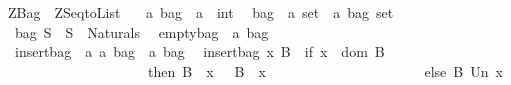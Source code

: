 %
\begin{isabellebody}%
\def\isabellecontext{ZBag}%
%
\isamarkuptrue%
%
\isadelimtheory
%
\endisadelimtheory
%
\isatagtheory
{}\isamarkupfalse%
\ ZBag\ \ ZSeqtoList\ %
\endisatagtheory
{\isafoldtheory}%
%
\isadelimtheory
%
\endisadelimtheory
\isanewline
\isanewline
{}\isamarkupfalse%
\isanewline
\isanewline
\ \ {\isacharparenleft}{\isacharprime}a{\isacharparenright}\ {\isachardoublequoteopen}bag{\isachardoublequoteclose}\ {\isacharequal}\ {\isachardoublequoteopen}{\isacharprime}a\ {\isacharless}{\isacharequal}{\isachargreater}\ int{\isachardoublequoteclose}\isanewline
\isanewline
{}\isamarkupfalse%
\isanewline
\ \ bag\ {\isacharcolon}{\isacharcolon}\ {\isachardoublequoteopen}{\isacharprime}a\ set\ {\isacharequal}{\isachargreater}\ {\isacharparenleft}{\isacharprime}a\ bag{\isacharparenright}\ set{\isachardoublequoteclose}\isanewline
\ \ {\isachardoublequoteopen}bag\ S\ {\isacharequal}{\isacharequal}\ S\ {\isacharminus}{\isacharbar}{\isacharminus}{\isachargreater}\ Naturals{\isacharunderscore}{}{\isachardoublequoteclose}\isanewline
\isanewline
\ \ emptybag\ {\isacharcolon}{\isacharcolon}\ {\isachardoublequoteopen}{\isacharprime}a\ bag{\isachardoublequoteclose}\ \ \ \ \ \ \ \ \ \ \ \ \ \ \ \ \ \ \ \ \ \ \ \ \ \ \ {\isacharparenleft}{\isachardoublequoteopen}{\isacharpercent}{\isacharbrackleft}{\isacharpercent}{\isacharbrackright}{\isachardoublequoteclose}{\isacharparenright}\isanewline
\ \ {\isachardoublequoteopen}{\isacharpercent}{\isacharbrackleft}{\isacharpercent}{\isacharbrackright}\ {\isacharequal}{\isacharequal}\ {\isacharbraceleft}{\isacharbraceright}{\isachardoublequoteclose}\isanewline
\isanewline
\ \ insertbag\ {\isacharcolon}{\isacharcolon}\ {\isachardoublequoteopen}{\isacharbrackleft}{\isacharprime}a{\isacharcomma}\ {\isacharprime}a\ bag{\isacharbrackright}\ {\isacharequal}{\isachargreater}\ {\isacharprime}a\ bag{\isachardoublequoteclose}\isanewline
\ \ {\isachardoublequoteopen}insertbag\ x\ B\ {\isacharequal}{\isacharequal}\ {\isacharparenleft}if\ x\ {\isacharcolon}\ dom\ B\ \isanewline
\ \ \ \ \ \ \ \ \ \ \ \ \ \ \ \ \ \ \ \ \ then\ {\isacharparenleft}B\ {\isacharparenleft}{\isacharplus}{\isacharparenright}\ {\isacharbraceleft}{\isacharparenleft}x{\isacharcomma}\ {}\ {\isacharplus}\ {\isacharparenleft}B\ {\isacharpercent}{\isacharcircum}\ x{\isacharparenright}{\isacharparenright}{\isacharbraceright}{\isacharparenright}\ \isanewline
\ \ \ \ \ \ \ \ \ \ \ \ \ \ \ \ \ \ \ \ \ else\ B\ Un\ {\isacharbraceleft}{\isacharparenleft}x{\isacharcomma}{}{\isacharparenright}{\isacharbraceright}{\isacharparenright}{\isachardoublequoteclose}\isanewline

\end{isabellebody}
